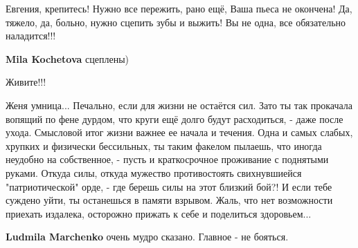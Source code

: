 \begin{itemize}
Евгения, крепитесь! Нужно все пережить, рано ещё, Ваша пьеса не окончена! Да,
тяжело, да, больно, нужно сцепить зубы и выжить! Вы не одна, все обязательно
наладится!!!

\begin{itemize}
 
\textbf{Mila Kochetova} сцеплены)
\end{itemize}

 
Живите!!!

 

Женя умница... Печально, если для жизни не остаётся сил. Зато ты так прокачала
вопящий по фене дурдом, что круги ещё долго будут расходиться, - даже после
ухода. Смысловой итог жизни важнее ее начала и течения. Одна и самых слабых,
хрупких и физически бессильных, ты таким факелом пылаешь, что иногда неудобно
на собственное, - пусть и краткосрочное проживание с поднятыми руками. Откуда
силы, откуда мужество противостоять свихнувшиейся "патриотической" орде, - где
берешь силы на этот близкий бой?! И если тебе суждено уйти, ты останешься в
памяти взрывом. Жаль, что нет возможности приехать издалека, осторожно прижать
к себе и поделиться здоровьем...

\begin{itemize}
 
\textbf{Ludmila Marchenko} очень мудро сказано. Главное - не бояться.

 

\end{itemize}
\end{itemize}
